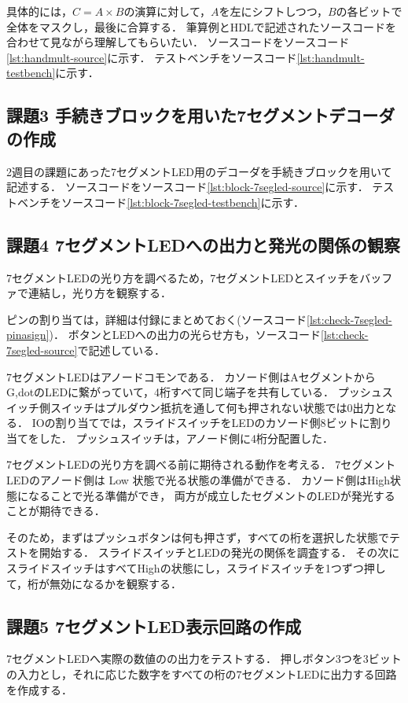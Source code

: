 具体的には，$C=A\times B$の演算に対して，$A$を左にシフトしつつ，$B$の各ビットで全体をマスクし，最後に合算する．
筆算例とHDLで記述されたソースコードを合わせて見ながら理解してもらいたい．
ソースコードをソースコード\ref{lst:handmult-source}に示す．
テストベンチをソースコード\ref{lst:handmult-testbench}に示す．


\subsection{課題3 手続きブロックを用いた7セグメントデコーダの作成}
2週目の課題にあった7セグメントLED用のデコーダを手続きブロックを用いて記述する．
ソースコードをソースコード\ref{lst:block-7segled-source}に示す．
テストベンチをソースコード\ref{lst:block-7segled-testbench}に示す．


\subsection{課題4 7セグメントLEDへの出力と発光の関係の観察}
7セグメントLEDの光り方を調べるため，7セグメントLEDとスイッチをバッファで連結し，光り方を観察する．

ピンの割り当ては，詳細は付録にまとめておく(ソースコード\ref{lst:check-7segled-pinasign})．
ボタンとLEDへの出力の光らせ方も，ソースコード\ref{lst:check-7segled-source}で記述している．

7セグメントLEDはアノードコモンである．
カソード側はAセグメントからG,dotのLEDに繋がっていて，4桁すべて同じ端子を共有している．
プッシュスイッチ側スイッチはプルダウン抵抗を通して何も押されない状態では0出力となる．
IOの割り当てでは，スライドスイッチをLEDのカソード側8ビットに割り当てをした．
プッシュスイッチは，アノード側に4桁分配置した．

7セグメントLEDの光り方を調べる前に期待される動作を考える．
7セグメントLEDのアノード側は Low 状態で光る状態の準備ができる．
カソード側はHigh状態になることで光る準備ができ，
両方が成立したセグメントのLEDが発光することが期待できる．

そのため，まずはプッシュボタンは何も押さず，すべての桁を選択した状態でテストを開始する．
スライドスイッチとLEDの発光の関係を調査する．
その次にスライドスイッチはすべてHighの状態にし，スライドスイッチを1つずつ押して，桁が無効になるかを観察する．

\subsection{課題5 7セグメントLED表示回路の作成}
7セグメントLEDへ実際の数値のの出力をテストする．
押しボタン3つを3ビットの入力とし，それに応じた数字をすべての桁の7セグメントLEDに出力する回路を作成する．

